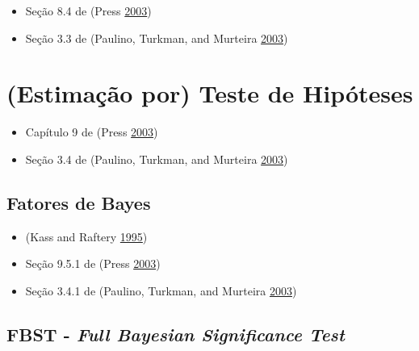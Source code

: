 \documentclass[
]{book}
\providecommand{\tightlist}{%
  \setlength{\itemsep}{0pt}\setlength{\parskip}{0pt}}
\theoremstyle{definition}
\theoremstyle{definition}
\theoremstyle{definition}
\theoremstyle{remark}
\begin{document}
\begin{itemize}
\tightlist
\item
  Seção 8.4 de (Press \protect\hyperlink{ref-press2003subjective}{2003})\\
\item
  Seção 3.3 de (Paulino, Turkman, and Murteira \protect\hyperlink{ref-paulino2003estatistica}{2003})\\
\end{itemize}

\hypertarget{estimauxe7uxe3o-por-teste-de-hipuxf3teses-1}{%
\section{(Estimação por) Teste de Hipóteses}\label{estimauxe7uxe3o-por-teste-de-hipuxf3teses-1}}

\begin{itemize}
\tightlist
\item
  Capítulo 9 de (Press \protect\hyperlink{ref-press2003subjective}{2003})\\
\item
  Seção 3.4 de (Paulino, Turkman, and Murteira \protect\hyperlink{ref-paulino2003estatistica}{2003})
\end{itemize}

\hypertarget{fatores-de-bayes}{%
\subsection{Fatores de Bayes}\label{fatores-de-bayes}}

\begin{itemize}
\tightlist
\item
  (Kass and Raftery \protect\hyperlink{ref-kass1995bayes}{1995})\\
\item
  Seção 9.5.1 de (Press \protect\hyperlink{ref-press2003subjective}{2003})\\
\item
  Seção 3.4.1 de (Paulino, Turkman, and Murteira \protect\hyperlink{ref-paulino2003estatistica}{2003})
\end{itemize}

\hypertarget{fbst---full-bayesian-significance-test}{%
\subsection{\texorpdfstring{FBST - \emph{Full Bayesian Significance Test}}{FBST - Full Bayesian Significance Test}}\label{fbst---full-bayesian-significance-test}}
\end{document}
